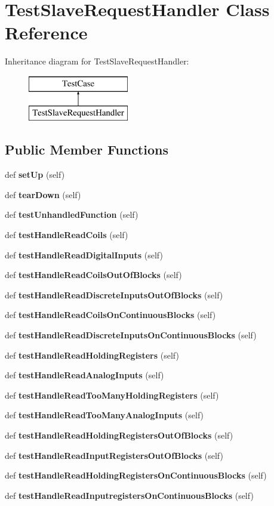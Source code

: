 \section{Test\+Slave\+Request\+Handler Class Reference}
\label{classtests_1_1unittest__modbus_1_1_test_slave_request_handler}
Inheritance diagram for Test\+Slave\+Request\+Handler\+:\begin{figure}[H]
\begin{center}
\leavevmode
\includegraphics[height=2.000000cm]{classtests_1_1unittest__modbus_1_1_test_slave_request_handler}
\end{center}
\end{figure}
\subsection*{Public Member Functions}
\begin{DoxyCompactItemize}
\item 
def {\bf set\+Up} (self)
\item 
def {\bf tear\+Down} (self)
\item 
def {\bf test\+Unhandled\+Function} (self)
\item 
def {\bf test\+Handle\+Read\+Coils} (self)
\item 
def {\bf test\+Handle\+Read\+Digital\+Inputs} (self)
\item 
def {\bf test\+Handle\+Read\+Coils\+Out\+Of\+Blocks} (self)
\item 
def {\bf test\+Handle\+Read\+Discrete\+Inputs\+Out\+Of\+Blocks} (self)
\item 
def {\bf test\+Handle\+Read\+Coils\+On\+Continuous\+Blocks} (self)
\item 
def {\bf test\+Handle\+Read\+Discrete\+Inputs\+On\+Continuous\+Blocks} (self)
\item 
def {\bf test\+Handle\+Read\+Holding\+Registers} (self)
\item 
def {\bf test\+Handle\+Read\+Analog\+Inputs} (self)
\item 
def {\bf test\+Handle\+Read\+Too\+Many\+Holding\+Registers} (self)
\item 
def {\bf test\+Handle\+Read\+Too\+Many\+Analog\+Inputs} (self)
\item 
def {\bf test\+Handle\+Read\+Holding\+Registers\+Out\+Of\+Blocks} (self)
\item 
def {\bf test\+Handle\+Read\+Input\+Registers\+Out\+Of\+Blocks} (self)
\item 
def {\bf test\+Handle\+Read\+Holding\+Registers\+On\+Continuous\+Blocks} (self)
\item 
def {\bf test\+Handle\+Read\+Inputregisters\+On\+Continuous\+Blocks} (self)
\end{DoxyCompactItemize}


